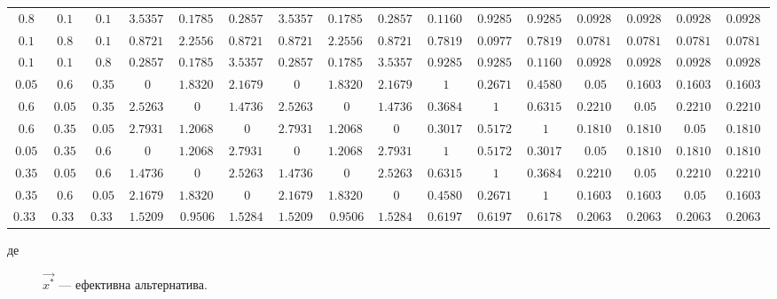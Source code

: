 \begin{landscape}
\begin{table}[H]
\begin{tabular}{c c c|c c c|c c c|c c c|c c c|c}
            $0.8$ & $0.1$ & $0.1$ & $3.53571$ & $0.17857$ & $0.28571$ & $3.53571$ & $0.17857$ & $0.28571$ & $0.11607$ & $0.92857$ & $0.92857$ & $0.09285$ & $0.09285$ & $0.09285$ & $0.09285$ \\
            $0.1$ & $0.8$ & $0.1$ & $0.87218$ & $2.25563$ & $0.87218$ & $0.87218$ & $2.25563$ & $0.87218$ & $0.78195$ & $0.09774$ & $0.78195$ & $0.07819$ & $0.07819$ & $0.07819$ & $0.07819$ \\
			$0.1$ & $0.1$ & $0.8$ & $0.28571$ & $0.17857$ & $3.53571$ & $0.28571$ & $0.17857$ & $3.53571$ & $0.92857$ & $0.92857$ & $0.11607$ & $0.09285$ & $0.09285$ & $0.09285$ & $0.09285$ \\
			$0.05$ & $0.6$ & $0.35$ & $0$ & $1.83206$ & $2.16793$ & $0$ & $1.83206$ & $2.16793$ & $1$ & $0.26717$ & $0.45801$ & $0.05$ & $0.16030$ & $0.16030$ & $0.16030$ \\
			$0.6$ & $0.05$ & $0.35$ & $2.52631$ & $0$ & $1.47368$ & $2.52631$ & $0$ & $1.47368$ & $0.36842$ & $1$ & $0.63157$ & $0.22105$ & $0.05$ & $0.22105$ & $0.22105$ \\
			$0.6$ & $0.35$ & $0.05$ & $2.79310$ & $1.20689$ & $0$ & $2.79310$ & $1.20689$ & $0$ & $0.30172$ & $0.51724$ & $1$ & $0.18103$ & $0.18103$ & $0.05$ & $0.18103$ \\
			$0.05$ & $0.35$ & $0.6$ & $0$ & $1.20689$ & $2.79310$ & $0$ & $1.20689$ & $2.79310$ & $1$ & $0.51724$ & $0.30172$ & $0.05$ & $0.18103$ & $0.18103$ & $0.18103$ \\ 
			$0.35$ & $0.05$ & $0.6$ & $1.47368$ & $0$ & $2.52631$ & $1.47368$ & $0$ & $2.52631$ & $0.63157$ & $1$ & $0.36842$ & $0.22105$ & $0.05$ & $0.22105$ & $0.22105$ \\ 
			$0.35$ & $0.6$ & $0.05$ & $2.16793$ & $1.83206$ & $0$ & $2.16793$ & $1.83206$ & $0$ & $0.45801$ & $0.26717$ & $1$ & $0.16030$ & $0.16030$ & $0.05$ & $0.16030$ \\
			$0.333$ & $0.333$ & $0.334$ & $1.52098$ & $0.9506$ & $1.52840$ & $1.52098$ & $0.9506$ & $1.52840$ & $0.61975$ & $0.61975$ & $0.61789$ & $0.20637$ & $0.20637$ & $0.20637$ & $0.20637$ \\ 
        \end{tabular}
        \end{table}
        \begin{description}
        	\item[де] $\vec{x^*}$ --- ефективна альтернатива.
        \end{description}
    \end{landscape}

